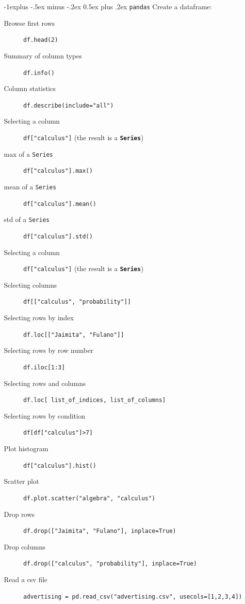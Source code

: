 \documentclass[10pt,landscape]{article}
\makeatletter
\renewcommand{\subsection}{\@startsection{subsection}{2}{0mm}%
                                {-1explus -.5ex minus -.2ex}%
                                {0.5ex plus .2ex}%
                                {\normalfont\normalsize\bfseries}}
\makeatother
\begin{document}
\begin{multicols*}{3}
\subsection{\texttt{pandas}}
Create a dataframe:
{\tiny

}
\begin{description}
  \item[Browse first rows] \texttt{df.head(2)}
  \item[Summary of column types] \texttt{df.info()}
  \item[Column statistics] \texttt{df.describe(include="all")}
  \item[Selecting a column] \texttt{df["calculus"]} (the result is a \texttt{\textbf{Series}})
  \item[max of a \texttt{Series}] \texttt{df["calculus"].max()}
  \item[mean of a \texttt{Series}] \texttt{df["calculus"].mean()}
  \item[std of a \texttt{Series}] \texttt{df["calculus"].std()}
  \item[Selecting a column] \texttt{df["calculus"]} (the result is a \texttt{\textbf{Series}})
  \item[Selecting columns] \texttt{df[["calculus", "probability"]]}
  \item[Selecting rows by index] \texttt{df.loc[["Jaimita", "Fulano"]]}
  \item[Selecting rows by row number] \texttt{df.iloc[1:3]}
  \item[Selecting rows and columns] \texttt{df.loc[ list\_of\_indices, list\_of\_columns]}
  \item[Selecting rows by condition] \texttt{df[df["calculus"]>7]}
  \item[Plot histogram] \texttt{df["calculus"].hist()}
  \item[Scatter plot] \texttt{df.plot.scatter("algebra", "calculus")}
  \item[Drop rows] \texttt{df.drop(["Jaimita", "Fulano"], inplace=True)}
  \item[Drop columns] \texttt{df.drop(["calculus", "probability"], inplace=True)}
  \item[Read a csv file] \texttt{advertising = pd.read\_csv("advertising.csv", usecols=[1,2,3,4])}
\end{description}



\end{multicols*}
\end{document}
